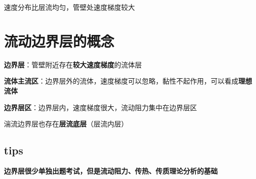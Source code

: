 \documentclass{book}
\DeclareRobustCommand{\bluebold}[1]{\textbf{\textcolor[rgb]{0.31,0.63,0.86}{#1}}}
\begin{document}
速度分布比层流均匀，管壁处速度梯度较大

\chapter{流动边界层的概念}

\bluebold{边界层}：管壁附近存在\bluebold{较大速度梯度}的流体层

\bluebold{流体主流区}：边界层外的流体，速度梯度可以忽略，黏性不起作用，可以看成\bluebold{理想流体}

\bluebold{边界层区}：边界层内，速度梯度很大，流动阻力集中在边界层区

湍流边界层也存在\bluebold{层流底层}（层流内层）

\section*{tips}

\bluebold{边界层很少单独出题考试，但是流动阻力、传热、传质理论分析的基础}
\end{document}
